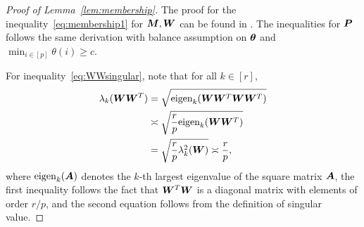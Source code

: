 \documentclass[journal]{IEEEtran}
\theoremstyle{definition}
\theoremstyle{definition}
\begin{document}
\begin{proof}[Proof of Lemma~\ref{lem:membership}] The proof for the inequality~\eqref{eq:membership1} for $\bm M, \bm{W}$ can be found in \cite[Proof of Lemma 4]{han2020exact}. The inequalities for $\bm{P}$ follows the same derivation with balance assumption on $\boldsymbol{\theta}$ and $\min_{i \in [p]}\theta(i) \geq c$.

For inequality~\eqref{eq:WWsingular}, note that for all $k \in [r]$,
\begin{align}
    \lambda_k(\bm{W}\bm{W}^T) &= \sqrt{\text{eigen}_k (\bm{W} \bm{W}^T\bm{W}\bm{W}^T)} \\
    &\asymp \sqrt{\frac{r}{p} \text{eigen}_k (\bm{W} \bm{W}^T)} \\
    &= \sqrt{\frac{r}{p} \lambda^2_k(\bm{W})} \asymp \frac{r}{p},
\end{align}
where $\text{eigen}_k(\bm A)$ denotes the $k$-th largest eigenvalue of the square matrix $\bm A$, the first inequality follows the fact that $\bm{W}^T\bm{W}$ is a diagonal matrix with elements of order $r/p$, and the second equation follows from the definition of singular value.
\end{proof}
\end{document}
